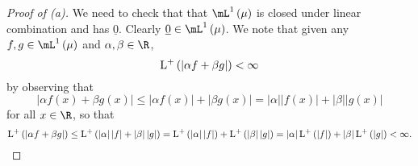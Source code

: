 \documentclass[pmath450]{subfiles}
\begin{document}
    \begin{proof}[Proof of (a)]
        We need to check that that $\mL^{1}\left( \mu \right)$ is closed under linear combination and has $\underline{0}$. Clearly $\underline{0}\in\mL^{1}\left( \mu \right)$. We note that given any $f,g\in\mL^{1}\left( \mu \right)$ and $\alpha,\beta\in\R$, 
        \begin{equation*}
            \operatorname{L^+}\left( \left| \alpha f+\beta g \right| \right) < \infty
        \end{equation*}
        by observing that
        \begin{equation*}
            \left| \alpha f\left( x \right)+\beta g\left( x \right) \right| \leq \left| \alpha f\left( x \right) \right|+\left| \beta g\left( x \right) \right| = \left| \alpha \right|\left| f\left( x \right) \right|+\left| \beta \right|\left| g\left( x \right) \right|
        \end{equation*}
        for all $x\in\R$, so that
        \begin{equation*}
            \operatorname{L^+}\left( \left| \alpha f+\beta g \right| \right) \leq \operatorname{L^+}\left( \left| \alpha \right|\left| f \right|+\left| \beta \right|\left| g \right| \right) = \operatorname{L^+}\left( \left| \alpha \right|\left| f \right| \right)+\operatorname{L^+}\left( \left| \beta \right|\left| g \right| \right) = \left| \alpha \right|\operatorname{L^+}\left( \left| f \right| \right)+\left| \beta \right|\operatorname{L^+}\left( \left| g \right| \right) < \infty.
        \end{equation*}
        \qedplacedtrue
    \end{proof}
\end{document}

